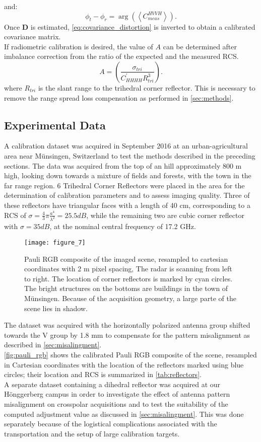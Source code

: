 and:
\begin{equation}
	\phi_t - \phi_r =\operatorname{arg}\left( \left<C_{meas}^{HVVH}\right>\right).
\end{equation}
Once $\mathbf{D}$ is estimated, \autoref{eq:covariance_distortion} is inverted to obtain a calibrated covariance matrix.\\
If radiometric calibration is desired, the value of $A$ can be determined after imbalance correction from the ratio of the expected and the measured RCS.
\begin{equation}
	A =	\left(\frac{\sigma_{tri}}{C^{\prime}_{HHHH} R_{tri}^{3}}\right).
\end{equation}
where $R_{tri}$ is the slant range to the trihedral corner reflector. This is necessary to remove the range spread loss compensation as performed in \autoref{sec:methods}.
\subsection{Experimental Data}\label{sec:data}
A calibration dataset was acquired in September 2016 at an urban-agricultural area near M\"{u}nsingen, Switzerland to test the methods described in the preceding sections. The data was acquired from the top of an hill approximately 800 m high, looking down towards a mixture of fields and forests, with the town in the far range region. 6 Trihedral Corner Reflectors were placed in the area for the determination of calibration parameters and to assess imaging quality. Three of these reflectors have triangular faces with a length of 40 cm, corresponding to a RCS of $\sigma=\frac{4}{3}\pi \frac{a^4}{\lambda^2}=25.5 dB$, while the remaining two are cubic corner reflector with $\sigma= 35 dB$, at the nominal central frequency of 17.2 GHz.
	\begin{figure*}
		\centering
		\texttt{[image: figure\_7]}
		\caption{Pauli RGB composite of the imaged scene, resampled to cartesian coordinates with 2 m pixel spacing, The radar is scanning from left to right. The location of corner reflectors is marked by cyan circles. The bright structures on the bottoms are buildings in the town of M\"{u}nsingen. Because of the acquisition geometry, a large parte of the scene lies in shadow.}
		\label{fig:pauli_rgb}
	\end{figure*}
The dataset was acquired with the horizontally polarized antenna group shifted towards the V group by 1.8 mm to compensate for the pattern misalignment as described in \autoref{sec:misalingment}.\\
\autoref{fig:pauli_rgb} shows the calibrated Pauli RGB composite of the scene, resampled in Cartesian coordinates with the location of the reflectors marked using blue circles; their location and RCS is summarized in \autoref{tab:reflectors}.\\
A separate dataset containing a dihedral reflector was acquired at our H\"{o}nggerberg campus in order to investigate the effect of antenna pattern misalignment on crosspolar acquisitions and to test the suitability of the computed adjustment value as discussed in \autoref{sec:misalingment}. This was done separately because of the logistical complications associated with the transportation and the setup of large calibration targets.

